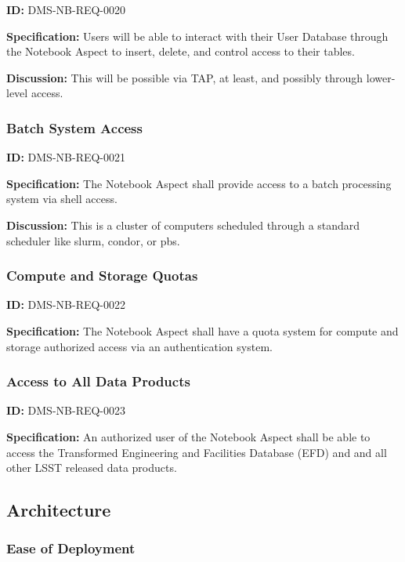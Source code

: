 \documentclass[SE,toc,lsstdraft]{lsstdoc}
\begin{document}
\label{DMS-NB-REQ-0020}
\textbf{ID:} DMS-NB-REQ-0020

\textbf{Specification:}
Users will be able to interact with their User Database through the Notebook Aspect to insert, delete, and control access to their tables.

\textbf{Discussion:}
This will be possible via TAP, at least, and possibly through lower-level access.

\subsubsection{Batch System Access}

\label{DMS-NB-REQ-0021}
\textbf{ID:} DMS-NB-REQ-0021

\textbf{Specification:}
The Notebook Aspect shall provide access to a batch processing system via shell access.

\textbf{Discussion:}
This is a cluster of computers scheduled through a standard scheduler like slurm, condor, or pbs.

\subsubsection{Compute and Storage Quotas}

\label{DMS-NB-REQ-0022}
\textbf{ID:} DMS-NB-REQ-0022

\textbf{Specification:}
The Notebook Aspect shall have a quota system for compute and storage authorized access via an authentication system.

\subsubsection{Access to All Data Products}

\label{DMS-NB-REQ-0023}
\textbf{ID:} DMS-NB-REQ-0023

\textbf{Specification:}
An authorized user of the Notebook Aspect shall be able to access the Transformed Engineering and Facilities Database (EFD) and and all other LSST released data products.

\subsection{Architecture}

\subsubsection{Ease of Deployment}
\end{document}
